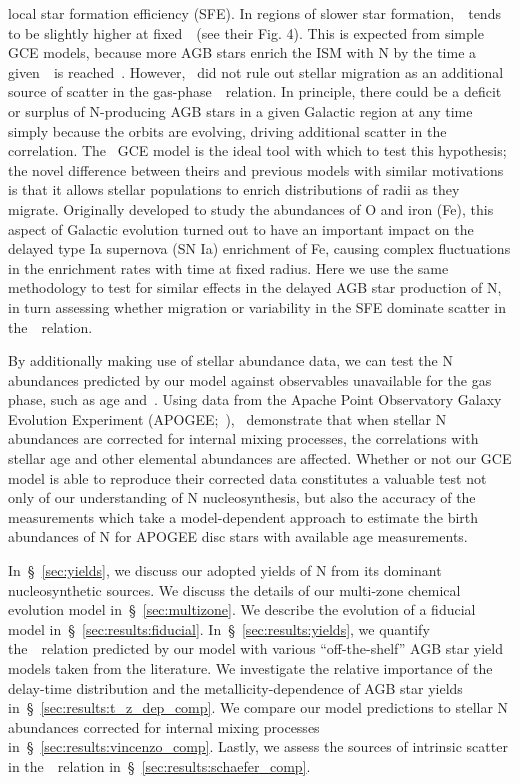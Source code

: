 \documentclass[ms.tex]{subfiles}
\begin{document}
local star formation efficiency (SFE).
In regions of slower star formation,~\no~tends to be slightly higher at
fixed~\oh~(see their Fig. 4).
This is expected from simple GCE models, because more AGB stars enrich the
ISM with N by the time a given~\oh~is reached~\citep[e.g.][]{Molla2006,
Vincenzo2016a}.
However,~\citet{Schaefer2020} did not rule out stellar migration as an
additional source of scatter in the gas-phase~\ohno~relation.
In principle, there could be a deficit or surplus of N-producing AGB stars in a
given Galactic region at any time simply because the orbits are evolving,
driving additional scatter in the correlation.
The~\citet{Johnson2021} GCE model is the ideal tool with which to test this
hypothesis; the novel difference between theirs and previous models with
similar motivations is that it allows stellar populations to enrich
distributions of radii as they migrate.
Originally developed to study the abundances of O and iron (Fe), this aspect of
Galactic evolution turned out to have an important impact on the delayed type
Ia supernova (SN Ia) enrichment of Fe, causing complex fluctuations in the
enrichment rates with time at fixed radius.
Here we use the same methodology to test for similar effects in the delayed AGB
star production of N, in turn assessing whether migration or variability in the
SFE dominate scatter in the~\ohno~relation.
\par
By additionally making use of stellar abundance data, we can test the N
abundances predicted by our model against observables unavailable for the gas
phase, such as age and~\ofe.
Using data from the Apache Point Observatory Galaxy Evolution Experiment
(APOGEE;~\citealp{Majewski2017}),~\citet{Vincenzo2021} demonstrate that when
stellar N abundances are corrected for internal mixing processes, the
correlations with stellar age and other elemental abundances are affected.
Whether or not our GCE model is able to reproduce their corrected data
constitutes a valuable test not only of our understanding of N nucleosynthesis,
but also the accuracy of the~\citet{Vincenzo2021} measurements which take a
model-dependent approach to estimate the birth abundances of N for APOGEE disc
stars with available age measurements.
\par
In~\S~\ref{sec:yields}, we discuss our adopted yields of N from its dominant
nucleosynthetic sources.
We discuss the details of our multi-zone chemical evolution model
in~\S~\ref{sec:multizone}.
We describe the evolution of a fiducial model in~\S~\ref{sec:results:fiducial}.
In~\S~\ref{sec:results:yields}, we quantify the~\ohno~relation predicted by our
model with various ``off-the-shelf'' AGB star yield models taken from the
literature.
We investigate the relative importance of the delay-time distribution and the
metallicity-dependence of AGB star yields in~\S~\ref{sec:results:t_z_dep_comp}.
We compare our model predictions to stellar N abundances corrected for internal
mixing processes in~\S~\ref{sec:results:vincenzo_comp}.
Lastly, we assess the sources of intrinsic scatter in the~\ohno~relation
in~\S~\ref{sec:results:schaefer_comp}.
\end{document}
